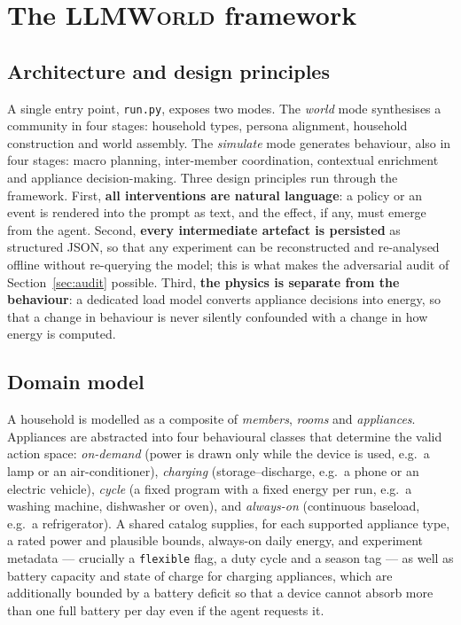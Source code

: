 \documentclass[11pt]{article}
\begin{document}
\section{The \textsc{LLMWorld} framework}

\subsection{Architecture and design principles}
A single entry point, \texttt{run.py}, exposes two modes. The \emph{world} mode synthesises a community in
four stages: household types, persona alignment, household construction and world assembly. The
\emph{simulate} mode generates behaviour, also in four stages: macro planning, inter-member coordination,
contextual enrichment and appliance decision-making. Three design principles run through the framework.
First, \textbf{all interventions are natural language}: a policy or an event is rendered into the prompt
as text, and the effect, if any, must emerge from the agent. Second, \textbf{every intermediate artefact
is persisted} as structured JSON, so that any experiment can be reconstructed and re-analysed offline
without re-querying the model; this is what makes the adversarial audit of Section~\ref{sec:audit}
possible. Third, \textbf{the physics is separate from the behaviour}: a dedicated load model converts
appliance decisions into energy, so that a change in behaviour is never silently confounded with a change
in how energy is computed.

\subsection{Domain model}
A household is modelled as a composite of \emph{members}, \emph{rooms} and \emph{appliances}. Appliances
are abstracted into four behavioural classes that determine the valid action space:
\emph{on-demand} (power is drawn only while the device is used, e.g.\ a lamp or an air-conditioner),
\emph{charging} (storage--discharge, e.g.\ a phone or an electric vehicle), \emph{cycle} (a fixed program
with a fixed energy per run, e.g.\ a washing machine, dishwasher or oven), and \emph{always-on}
(continuous baseload, e.g.\ a refrigerator). A shared catalog supplies, for each supported appliance
type, a rated power and plausible bounds, always-on daily energy, and experiment metadata --- crucially a
\texttt{flexible} flag, a duty cycle and a season tag --- as well as battery capacity and state of charge
for charging appliances, which are additionally bounded by a battery deficit so that a device cannot
absorb more than one full battery per day even if the agent requests it.
\end{document}
